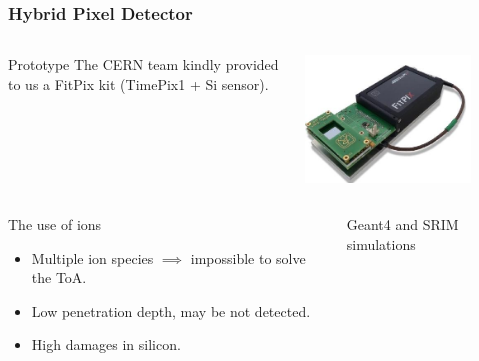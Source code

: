 \begin{frame}[t]
  \frametitle{Hybrid Pixel Detector}
  \begin{columns}[T]
    \begin{column}{0.45\textwidth}
      \begin{block}{Prototype}
        The CERN team kindly provided to us a FitPix kit (TimePix1 + Si sensor).
      \end{block}
    \end{column}
    \begin{column}{0.45\textwidth}
      \includegraphics[width=0.8\textwidth]{03_SIM/fig/fig000_FitPix}
    \end{column}
  \end{columns}
  \vskip 0.5cm
  \begin{columns}[T]
    \begin{column}{0.45\textwidth}
      \begin{alertblock}{The use of ions}
        \begin{itemize}
          \item Multiple ion species $\implies$ impossible to solve the ToA.
          \item Low penetration depth, may be not detected.
          \item High damages in silicon.
        \end{itemize}
      \end{alertblock}
    \end{column}
    \begin{column}{0.45\textwidth}
      \centering
      Geant4 and SRIM simulations

\end{column}
\end{columns}
\end{frame}
